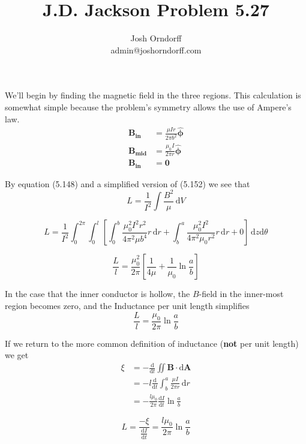 \documentclass[10pt,a4paper]{article}
\begin{document}
\title{J.D. Jackson Problem 5.27}
\author{Josh Orndorff \\ admin@joshorndorff.com}
\maketitle

We'll begin by finding the magnetic field in the three regions.  This calculation is somewhat simple because the problem's symmetry allows the use of Ampere's law.
\begin{align}
\mathbf{B_{in}}&=\frac{\mu Ir}{2\pi b^2}\mathbf{\hat{\phi}} \\
\mathbf{B_{mid}}&=\frac{\mu_0 I}{2\pi r}\mathbf{\hat{\phi}} \\
\mathbf{B_{in}}&=\mathbf{0}
\end{align}

By equation (5.148) and a simplified version of (5.152) we see that
\begin{equation}
L=\frac{1}{I^2}\int\frac{B^2}{\mu}\,\mathrm{d}V
\end{equation}

\begin{equation}
L=\frac{1}{I^2}\int_0^{2\pi}\int_0^l \left[\int_0^b\frac{\mu_0^2I^2r^2}{4\pi^2\mu b^4}r\,\mathrm{d}r + \int_b^a\frac{\mu_0^2 I^2}{4\pi^2\mu_0 r^2}r\,\mathrm{d}r +0\right]\,\mathrm{d}z\mathrm{d}\theta
\end{equation}

\begin{equation}\boxed{
\frac{L}{l}=\frac{\mu_0^2}{2\pi}\left[\frac{1}{4\mu}+\frac{1}{\mu_0} \ln\frac{a}{b}\right]
}\end{equation}


In the case that the inner conductor is hollow, the $B$-field in the inner-most region becomes zero, and the Inductance per unit length simplifies
\begin{equation}\boxed{
\frac{L}{l}=\frac{\mu_0}{2\pi}\ln\frac{a}{b}
}\end{equation}

If we return to the more common definition of inductance (\textbf{not} per unit length) we get
\begin{align}
\xi&=-\frac{\mathrm{d}}{\mathrm{d}t}\iint\mathbf{B}\cdot\mathrm{d}\mathbf{A} \\
&=-l\frac{\mathrm{d}}{\mathrm{d}t}\int_b^a\frac{\mu I}{2\pi r}\,\mathrm{d}r \\
&=-\frac{l\mu_0}{2\pi}\frac{\mathrm{d}I}{\mathrm{d}t}\ln\frac{a}{b}
\end{align}

\begin{equation}\boxed{
L=\frac{-\xi}{\frac{\mathrm{d}I}{\mathrm{d}t}}=\frac{l\mu_0}{2\pi}\ln\frac{a}{b}
}\end{equation}
\end{document}
